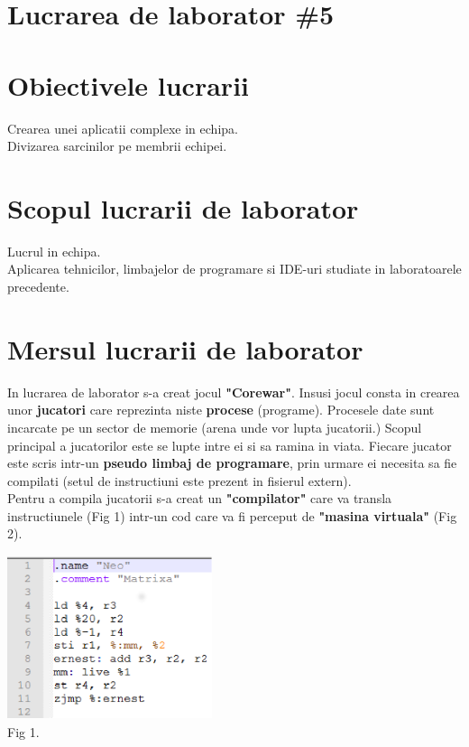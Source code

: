 \section*{Lucrarea de laborator \#5}

\section{Obiectivele lucrarii}

Crearea unei aplicatii complexe in echipa.
~\\
Divizarea sarcinilor pe membrii echipei.

\section{Scopul lucrarii de laborator}

Lucrul in echipa.
~\\
Aplicarea tehnicilor, limbajelor de programare si 
IDE-uri studiate in laboratoarele precedente.

\section{Mersul lucrarii de laborator}

\tab In lucrarea de laborator s-a creat jocul \textbf{"Corewar"}.
Insusi jocul consta in crearea unor \textbf{jucatori} care reprezinta niste \textbf{procese} (programe).
Procesele date sunt incarcate pe un sector de memorie (arena unde vor lupta jucatorii.)
Scopul principal a jucatorilor este se lupte intre ei si sa ramina in viata.
Fiecare jucator este scris intr-un \textbf{pseudo limbaj de programare}, prin urmare ei necesita sa fie compilati
(setul de instructiuni este prezent in fisierul extern).
~\\
\tab Pentru a compila jucatorii s-a creat un \textbf{"compilator"} care va transla instructiunele (Fig 1) intr-un cod care va fi
 perceput de \textbf{"masina virtuala"} (Fig 2).

\begin{center}
\includegraphics[width=6cm, height=4.8cm]{1.eps}
~\\
Fig 1.
\end{center}
\clearpage

